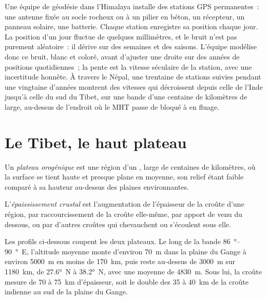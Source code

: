 \begin{inthefield}
Une équipe de géodésie dans l'Himalaya installe des stations GPS permanentes~: une antenne fixée
au socle rocheux ou à un pilier en béton, un récepteur, un panneau solaire, une batterie. Chaque
station enregistre sa position chaque jour. La position d'un jour fluctue de quelques millimètres,
et le bruit n'est pas purement aléatoire~: il dérive sur des semaines et des saisons. L'équipe
modélise donc ce bruit, blanc et coloré, avant d'ajuster une droite sur des années de positions
quotidiennes~; la pente est la vitesse séculaire de la station, avec une incertitude honnête. À
travers le Népal, une trentaine de stations suivies pendant une vingtaine d'années montrent des
vitesses qui décroissent depuis celle de l'Inde jusqu'à celle du sud du Tibet, sur une bande d'une
centaine de kilomètres de large, au-dessus de l'endroit où le MHT passe de bloqué à en fluage.
\end{inthefield}

\section{Le Tibet, le haut plateau}\label{sec:b2:himalaya-andes:tibet}

\begin{definition}\label{def:b2:himalaya-andes:plateau}
Un \emph{plateau orogénique} est une région d'un ,
large de centaines de kilomètres, où la surface se tient haute et presque plane en moyenne,
son relief étant faible comparé à sa hauteur au-dessus des plaines environnantes.
\end{definition}

\begin{definition}\label{def:b2:himalaya-andes:thickening}
L'\emph{épaississement crustal} est l'augmentation de l'épaisseur
de la croûte d'une région, par raccourcissement de la croûte elle-même, par apport
de  venu du dessous, ou par d'autres croûtes qui chevauchent ou s'écoulent sous elle.
\end{definition}

Les profils ci-dessous coupent les deux plateaux. Le long de la bande \qtyrange{86}{90}{\degree}~E,
l'altitude moyenne monte d'environ \qty{70}{m} dans la plaine du Gange à environ \qty{5000}{m} en
moins de \qty{170}{km}, puis reste au-dessus de \qty{3000}{m} sur \qty{1180}{km}, de \ang{27.6}~N à
\ang{38.2}~N, avec une moyenne de \qty{4830}{m}. Sous lui, la croûte mesure de 70 à \qty{75}{km}
d'épaisseur, soit le double des 35 à \qty{40}{km} de la croûte indienne au sud de la plaine du Gange.

